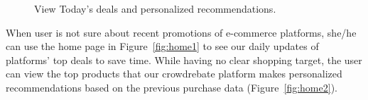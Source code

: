 \begin{figure}[t!]
	\caption{View Today's deals and personalized recommendations.}\vspace{-1ex}
	\label{fig:home}
\end{figure}
When user is not sure about recent promotions of e-commerce platforms, she/he can use the home page in Figure~\ref{fig:home1} to see our daily updates of platforms' top deals to save time. While having no clear shopping target, the user can view the top products that our crowdrebate platform makes personalized recommendations based on the previous purchase data (Figure~\ref{fig:home2}).

